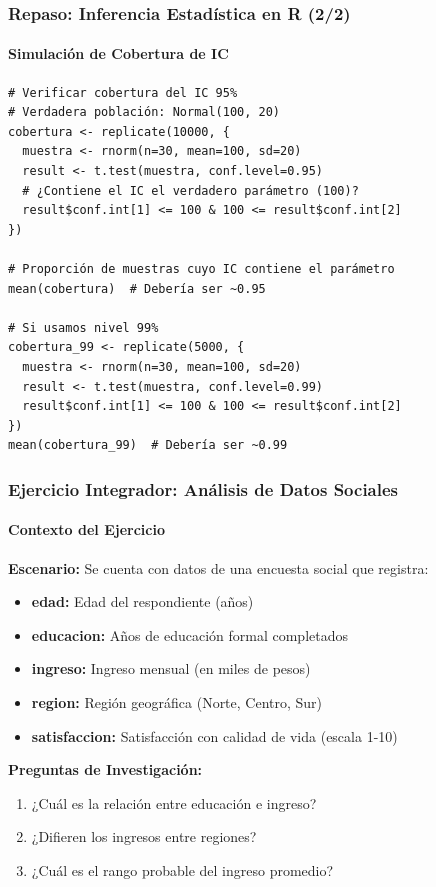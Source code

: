 \documentclass[aspectratio=169,11pt]{beamer}
\begin{document}
\begin{frame}[fragile]
\frametitle{Repaso: Inferencia Estadística en R (2/2)}
\framesubtitle{Simulación de Cobertura de IC}
\begin{lstlisting}
# Verificar cobertura del IC 95%
# Verdadera población: Normal(100, 20)
cobertura <- replicate(10000, {
  muestra <- rnorm(n=30, mean=100, sd=20)
  result <- t.test(muestra, conf.level=0.95)
  # ¿Contiene el IC el verdadero parámetro (100)?
  result$conf.int[1] <= 100 & 100 <= result$conf.int[2]
})

# Proporción de muestras cuyo IC contiene el parámetro
mean(cobertura)  # Debería ser ~0.95

# Si usamos nivel 99%
cobertura_99 <- replicate(5000, {
  muestra <- rnorm(n=30, mean=100, sd=20)
  result <- t.test(muestra, conf.level=0.99)
  result$conf.int[1] <= 100 & 100 <= result$conf.int[2]
})
mean(cobertura_99)  # Debería ser ~0.99
\end{lstlisting}
\end{frame}

\begin{frame}
\frametitle{Ejercicio Integrador: Análisis de Datos Sociales}
\framesubtitle{Contexto del Ejercicio}
\textbf{Escenario:} Se cuenta con datos de una encuesta social que registra:
\begin{itemize}
  \item \textbf{edad:} Edad del respondiente (años)
  \item \textbf{educacion:} Años de educación formal completados
  \item \textbf{ingreso:} Ingreso mensual (en miles de pesos)
  \item \textbf{region:} Región geográfica (Norte, Centro, Sur)
  \item \textbf{satisfaccion:} Satisfacción con calidad de vida (escala 1-10)
\end{itemize}

\vspace{0.3cm}
\textbf{Preguntas de Investigación:}
\begin{enumerate}
  \item ¿Cuál es la relación entre educación e ingreso?
  \item ¿Difieren los ingresos entre regiones?
  \item ¿Cuál es el rango probable del ingreso promedio?
\end{enumerate}
\end{frame}
\end{document}
